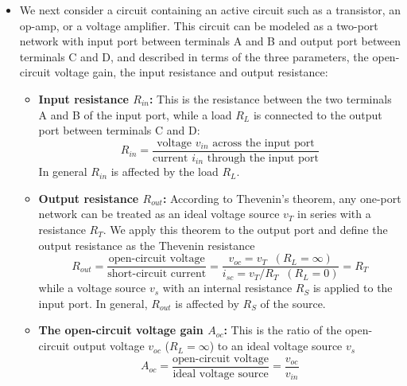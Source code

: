 \begin{itemize}
\begin{itemize}
  \begin{comment}
    {\bf Example 2:}
    \[ v_{in}=v_s \frac{r_{in}}{R_S+r_{in}} \]
    \[ v_{out}=G_v v_{in} \frac{R_L}{R_L+r_{out}}
    =G_v v_s \frac{r_{in}}{R_S+r_{in}} \frac{R_L}{R_L+r_{out}} \]

    The alternative definitions of these voltage, current, and power 
    gains may be used, depending on the specific applications.
  \end{comment}

\item We next consider a circuit containing an active circuit such as 
  a transistor, an op-amp, or a voltage amplifier. This circuit can be 
  modeled as a two-port network with input port between terminals A 
  and B and output port between terminals C and D, and described in 
  terms of the three parameters, the open-circuit voltage gain, the 
  input resistance and output resistance:


  \begin{itemize}
  \item {\bf Input resistance $R_{in}$:} This is the resistance between 
    the two terminals A and B of the input port, while a load $R_L$ is 
    connected to the output port between terminals C and D:
    \[ 
    R_{in}=\frac{\mbox{voltage $v_{in}$ across the input port}}
    {\mbox{current $i_{in}$ through the input port}} 
    \]
    In general $R_{in}$ is affected by the load $R_L$.
  \item {\bf Output resistance $R_{out}$:} According to Thevenin's theorem, 
    any one-port network can be treated as an ideal voltage source $v_T$ in 
    series with a resistance $R_T$. We apply this theorem to the output port
    and define the output resistance as the Thevenin resistance 
    \[
    R_{out}=\frac{\mbox{open-circuit voltage}}{\mbox{short-circuit current}}
    =\frac{v_{oc}=v_T\;\;(R_L=\infty)}{i_{sc}=v_T/R_T\;\;(R_L=0)}=R_T
    \]
    while a voltage source $v_s$ with an internal resistance $R_S$ is applied 
    to the input port. In general, $R_{out}$ is affected by $R_S$ of the source.
  \item {\bf The open-circuit voltage gain $A_{oc}$:} This is the ratio of the 
    open-circuit output voltage $v_{oc}$ ($R_L=\infty$) to an ideal voltage 
    source $v_s$ 
    \[
    A_{oc}=\frac{\mbox{open-circuit voltage}}{\mbox{ideal voltage source}}
    =\frac{v_{oc}}{v_{in}}
    \]
  \end{itemize}


\end{itemize}
\end{itemize}
